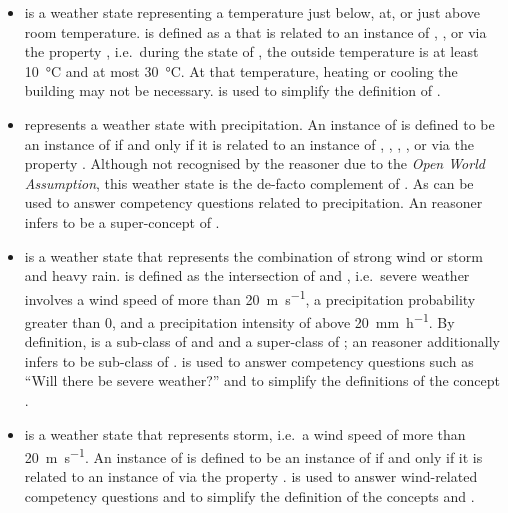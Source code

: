 \begin{itemize}
  \item {} is a weather state representing a temperature just below, at, or just above room temperature.  is defined as a  that is related to an instance of , , or  via the property , i.e.\ during the state of , the outside temperature is at least \SI{10}{\celsius} and at most \SI{30}{\celsius}. At that temperature, heating or cooling the building may not be necessary.  is used to simplify the definition of .
  
  \item {} represents a weather state with precipitation. An instance of  is defined to be an instance of  if and only if it is related to an instance of , , , , or  via the property . Although not recognised by the  reasoner due to the \emph{Open World Assumption}, this weather state is the de-facto complement of . As  can be used to answer competency questions related to precipitation. An  reasoner infers  to be a super-concept of .

  \item {} is a weather state that represents the combination of strong wind or storm and heavy rain.  is defined as the intersection of  and , i.e.\ severe weather involves a wind speed of more than \SI{20}{\metre\per\second}, a precipitation probability greater than \num{0}, and a precipitation intensity of above \SI{20}{\milli\metre\per\hour}. By definition,  is a sub-class of  and  and a super-class of ; an  reasoner additionally infers  to be sub-class of .  is used to answer competency questions such as ``Will there be severe weather?'' and to simplify the definitions of the concept .
  
  \item {} is a weather state that represents storm, i.e.\ a wind speed of more than \SI{20}{\metre\per\second}. An instance of  is defined to be an instance of  if and only if it is related to an instance of  via the property .  is used to answer wind-related competency questions and to simplify the definition of the concepts  and .
  

\end{itemize}
